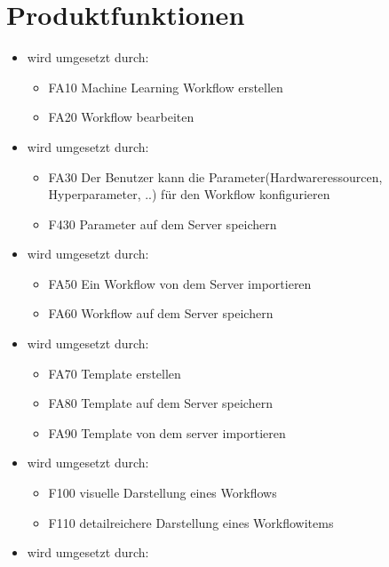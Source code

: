 \section{Produktfunktionen}
    \begin{itemize}
        \item {} wird umgesetzt durch:
        \begin{itemize}
            \item FA10 Machine Learning Workflow erstellen
            \item FA20 Workflow bearbeiten
        \end{itemize}
        \item {} wird umgesetzt durch:
        \begin{itemize}
            \item FA30 Der Benutzer kann die Parameter(Hardwareressourcen, Hyperparameter, ..) für den Workflow konfigurieren
            \item F430 Parameter auf dem Server speichern
        \end{itemize}
        \item {} wird umgesetzt durch:
        \begin{itemize}
            \item FA50 Ein Workflow von dem Server importieren
            \item FA60 Workflow auf dem Server speichern
        \end{itemize}
        \item {} wird umgesetzt durch:
        \begin{itemize}
            \item FA70 Template erstellen
            \item FA80 Template auf dem Server speichern
            \item FA90 Template von dem server importieren
        \end{itemize}
        \item {} wird umgesetzt durch:
        \begin{itemize}
            \item F100 visuelle Darstellung eines Workflows
            \item F110 detailreichere Darstellung eines Workflowitems
        \end{itemize}
        \item {} wird umgesetzt durch:
        \begin{itemize}

\end{itemize}
\end{itemize}
